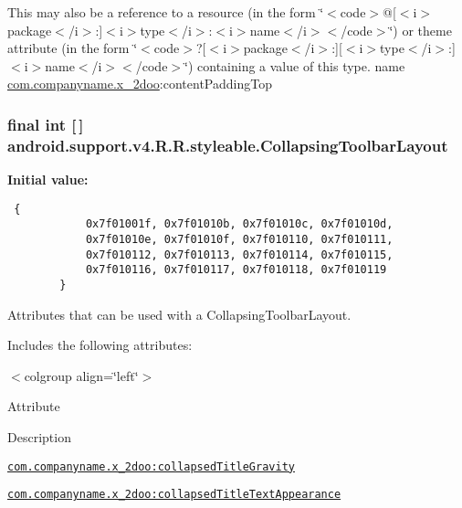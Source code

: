 This may also be a reference to a resource (in the form \char`\"{}$<$code$>$@\mbox{[}$<$i$>$package$<$/i$>$:\mbox{]}$<$i$>$type$<$/i$>$:$<$i$>$name$<$/i$>$$<$/code$>$\char`\"{}) or theme attribute (in the form \char`\"{}$<$code$>$?\mbox{[}$<$i$>$package$<$/i$>$:\mbox{]}\mbox{[}$<$i$>$type$<$/i$>$:\mbox{]}$<$i$>$name$<$/i$>$$<$/code$>$\char`\"{}) containing a value of this type.  name \hyperlink{namespacecom_1_1companyname_1_1x__2doo}{com.companyname.x\_\-2doo}:contentPaddingTop \hypertarget{classandroid_1_1support_1_1v4_1_1_r_1_1styleable_aa101903fcf4b45a3b7fee0a0abc5ea8}{
\subsubsection[{CollapsingToolbarLayout}]{\setlength{\rightskip}{0pt plus 5cm}final int \mbox{[}$\,$\mbox{]} android.support.v4.R.R.styleable.CollapsingToolbarLayout}}
\label{classandroid_1_1support_1_1v4_1_1_r_1_1styleable_aa101903fcf4b45a3b7fee0a0abc5ea8}


\textbf{Initial value:}

\begin{Code}\begin{verbatim} {
            0x7f01001f, 0x7f01010b, 0x7f01010c, 0x7f01010d,
            0x7f01010e, 0x7f01010f, 0x7f010110, 0x7f010111,
            0x7f010112, 0x7f010113, 0x7f010114, 0x7f010115,
            0x7f010116, 0x7f010117, 0x7f010118, 0x7f010119
        }
\end{verbatim}
\end{Code}
Attributes that can be used with a CollapsingToolbarLayout. 

Includes the following attributes: \begin{TabularC}{0}
\hline
\end{TabularC}
$<$colgroup align=\char`\"{}left\char`\"{}$>$ 

Attribute

Description 

{\tt \hyperlink{classandroid_1_1support_1_1v4_1_1_r_1_1styleable_759294fa22d1c3489a65fb1670048ebd}{com.companyname.x\_\-2doo:collapsedTitleGravity}}

{\tt \hyperlink{classandroid_1_1support_1_1v4_1_1_r_1_1styleable_36b5814dff9ad7add6371c9f816f66f0}{com.companyname.x\_\-2doo:collapsedTitleTextAppearance}}

